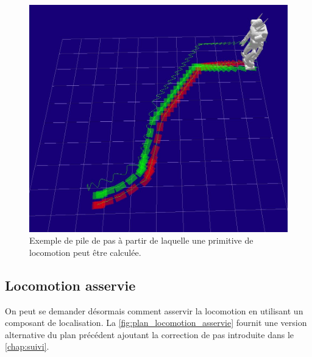 \begin{figure}
  \begin{center}
    \includegraphics[width=.95\linewidth]{src/chap3-primitive-mouvement/footsteps1.jpg}
  \end{center}
  \caption{Exemple de pile de pas à partir de laquelle une primitive
    de locomotion peut être calculée.}
\end{figure}


\FloatBarrier

\subsection{Locomotion asservie}

On peut se demander désormais comment asservir la locomotion en
utilisant un composant de localisation. La
\autoref{fig:plan_locomotion_asservie} fournit une version alternative
du plan précédent ajoutant la correction de pas introduite dans le
\autoref{chap:suivi}.

